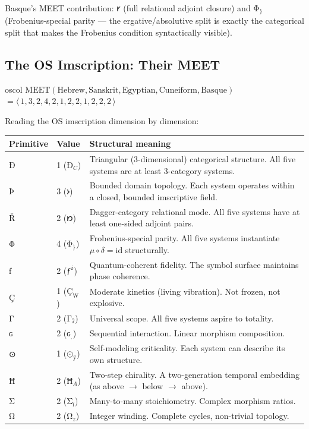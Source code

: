 \documentclass[12pt,a4paper]{article}
\newcommand{\ig}[1]{{\igprimfont #1}}
\begin{document}
Basque's MEET contribution: 𐑾 (full relational adjoint closure) and $\text{Φ}_\}$ (Frobenius-special parity --- the ergative/absolutive split is exactly the categorical split that makes the Frobenius condition syntactically visible).

\subsection{The OS Imscription: Their MEET}

\begin{admonitionbox}[OS Imscription]{oscol}
$\mathrm{MEET}(\text{Hebrew}, \text{Sanskrit}, \text{Egyptian}, \text{Cuneiform}, \text{Basque})$
$= \langle\,1,3,2,4,2,1,2,2,1,2,2,2\,\rangle$
\end{admonitionbox}

Reading the OS imscription dimension by dimension:

\begin{center}
\small
\begin{tabular}{ll p{7cm}}
\toprule
Primitive & Value & Structural meaning \\
\midrule
\ig{Ð} & 1 ($\text{Ð}_C$) & Triangular (3-dimensional) categorical structure. All five systems are at least 3-category systems. \\
\ig{Þ} & 3 (𐑶) & Bounded domain topology. Each system operates within a closed, bounded imscriptive field. \\
\ig{Ř} & 2 (𐑽) & Dagger-category relational mode. All five systems have at least one-sided adjoint pairs. \\
\ig{Φ} & 4 ($\text{Φ}_\}$) & Frobenius-special parity. All five systems instantiate $\mu \circ \delta = \mathrm{id}$ structurally. \\
\ig{ƒ} & 2 ($\text{ƒ}^\text{ż}$) & Quantum-coherent fidelity. The symbol surface maintains phase coherence. \\
\ig{Ç} & 1 ($\text{Ç}_\text{W}$) & Moderate kinetics (living vibration). Not frozen, not explosive. \\
\ig{Γ} & 2 ($\text{Γ}_\text{ʔ}$) & Universal scope. All five systems aspire to totality. \\
\ig{ɢ} & 2 ($\text{ɢ}_\text{ˌ}$) & Sequential interaction. Linear morphism composition. \\
\ig{⊙} & 1 ($\text{⊙}_\text{ÿ}$) & Self-modeling criticality. Each system can describe its own structure. \\
\ig{Ħ} & 2 ($\text{Ħ}_A$) & Two-step chirality. A two-generation temporal embedding (as above $\to$ below $\to$ above). \\
\ig{Σ} & 2 ($\text{Σ}_\text{ï}$) & Many-to-many stoichiometry. Complex morphism ratios. \\
\ig{Ω} & 2 ($\text{Ω}_z$) & Integer winding. Complete cycles, non-trivial topology. \\
\bottomrule
\end{tabular}
\end{center}
\end{document}
